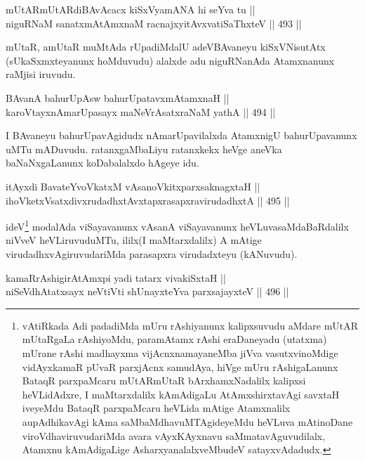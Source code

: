 \begin{shl}
mUtARmUtARdiBAvAcacx kiSxVyamANA hi seYva tu || \\
niguRNaM sanatxmAtAmxnaM racnajxyitAvx\s vatiSaThxteV \hfill || 493 ||  
\end{shl}

\begin{artha}
mUtaR, amUtaR muMtAda rUpadiMdalU adeV\break BAvaneyu kiSxVNisutAtx
(sUkaSxmxteyanunx hoMduvudu) alalxde adu niguRNanAda Atamxnanunx
raMjisi iruvudu.
\end{artha}

\begin{shl}
BAvanA bahurUpA\s sw bahurUpatavxmAtamxnaH || \\
karoVtayxnAmarUpasayx maNeVrAsatxraNaM yathA \hfill || 494 ||  
\end{shl}

\begin{artha}
I BAvaneyu bahurUpavAgidudx nAmarUpavilalxda AtamxnigU bahurUpavanunx
uMTu mADuvudu. ratanxgaMbaLiyu ratanxkekx heVge aneVka
baNaNxgaLanunx koDabalalxdo hAgeye idu.
\end{artha}


\begin{shl}
itAyxdi BavateYvoVkatxM vAsanoVkitxparxsaknagxtaH ||  \\
ihoVketxVsatxdivxrudadhxtAvxtapxrasapxravirudadhxtA \hfill || 495 ||  
\end{shl}

\begin{artha}
ideV\footnote{vAtiRkada Adi padadiMda mUru rAshiyanunx kalipxsuvudu
aMdare mUtAR mUtaRgaLa rAshiyoMdu, paramAtamx rAshi eraDaneyadu
(utatxma) mUrane rAshi madhayxma vijAcnxnamayaneMba jiVva
vasutxvinoMdige vidAyxkamaR pUvaR parxjAcnx samudAya, hiVge mUru
rAshigaLanunx BataqR parxpaMcaru mUtARmUtaR bArxhamxNadalilx
kalipxsi heVLidAdxre, I maMtarxdalilx kAmAdigaLu AtAmxshirxtavAgi
savxtaH iveyeMdu BataqR parxpaMcaru heVLida mAtige Atamxnalilx
aupAdhikavAgi kAma saMbaMdhavuMTAgideyeMdu heVLuva mAtinoDane
viroVdhaviruvudariMda avara vAyxKAyxnavu saMmatavAguvudilalx,
Atamxnu kAmAdigaLige AsharxyanalalxveMbudeV satayxvAdadudx.} modalAda viSayavanunx vAsanA viSayavanunx
heVLuvasaMdaBaRdalilx niVveV heVLiruvuduMTu, ililx\footnotemark[2](I maMtarxdalilx) A mAtige virudadhxvAgiruvudariMda parasapxra
virudadxteyu (kANuvudu).
\end{artha}

\begin{shl}
kamaRrAshigirA\s \s tAmx\s pi yadi tatarx vivakiSxtaH || \\
niSeVdhAtatxsayx neVtiVti shUnayxteYva parxsajayxteV \hfill || 496 ||  
\end{shl}

